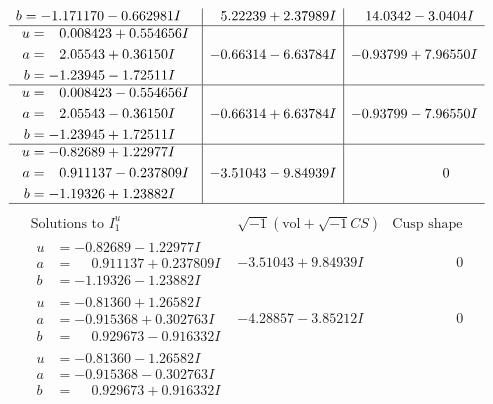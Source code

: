 \documentclass[1p]{elsarticle_modified}
\theoremstyle{definition}
\newcommand{\I}{\sqrt{-1}}
\begin{document}
$$\begin{array}{c|c|c}
\begin{aligned}
b &= -1.171170 - 0.662981 I\end{aligned}
 & \phantom{-}5.22239 + 2.37989 I & \phantom{-}14.0342 - 3.0404 I \\ \hline\begin{aligned}
u &= \phantom{-}0.008423 + 0.554656 I \\
a &= \phantom{-}2.05543 + 0.36150 I \\
b &= -1.23945 - 1.72511 I\end{aligned}
 & -0.66314 - 6.63784 I & -0.93799 + 7.96550 I \\ \hline\begin{aligned}
u &= \phantom{-}0.008423 - 0.554656 I \\
a &= \phantom{-}2.05543 - 0.36150 I \\
b &= -1.23945 + 1.72511 I\end{aligned}
 & -0.66314 + 6.63784 I & -0.93799 - 7.96550 I \\ \hline\begin{aligned}
u &= -0.82689 + 1.22977 I \\
a &= \phantom{-}0.911137 - 0.237809 I \\
b &= -1.19326 + 1.23882 I\end{aligned}
 & -3.51043 - 9.84939 I & \phantom{-0.000000 } 0\\
 \hline 
 \end{array}$$\newpage$$\begin{array}{c|c|c}  
\text{Solutions to }I^u_{1}& \I (\text{vol} + \sqrt{-1}CS) & \text{Cusp shape}\\
 \hline 
\begin{aligned}
u &= -0.82689 - 1.22977 I \\
a &= \phantom{-}0.911137 + 0.237809 I \\
b &= -1.19326 - 1.23882 I\end{aligned}
 & -3.51043 + 9.84939 I & \phantom{-0.000000 } 0 \\ \hline\begin{aligned}
u &= -0.81360 + 1.26582 I \\
a &= -0.915368 + 0.302763 I \\
b &= \phantom{-}0.929673 - 0.916332 I\end{aligned}
 & -4.28857 - 3.85212 I & \phantom{-0.000000 } 0 \\ \hline\begin{aligned}
u &= -0.81360 - 1.26582 I \\
a &= -0.915368 - 0.302763 I \\
b &= \phantom{-}0.929673 + 0.916332 I\end{aligned}

\end{array}$$
\end{document}
